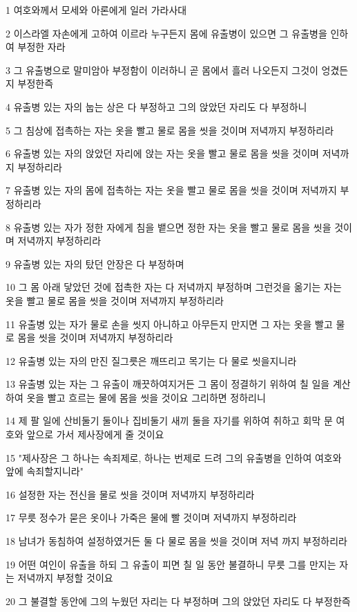 \par 1 여호와께서 모세와 아론에게 일러 가라사대
\par 2 이스라엘 자손에게 고하여 이르라 누구든지 몸에 유출병이 있으면 그 유출병을 인하여 부정한 자라
\par 3 그 유출병으로 말미암아 부정함이 이러하니 곧 몸에서 흘러 나오든지 그것이 엉겼든지 부정한즉
\par 4 유출병 있는 자의 눕는 상은 다 부정하고 그의 앉았던 자리도 다 부정하니
\par 5 그 침상에 접촉하는 자는 옷을 빨고 물로 몸을 씻을 것이며 저녁까지 부정하리라
\par 6 유출병 있는 자의 앉았던 자리에 앉는 자는 옷을 빨고 물로 몸을 씻을 것이며 저녁까지 부정하리라
\par 7 유출병 있는 자의 몸에 접촉하는 자는 옷을 빨고 물로 몸을 씻을 것이며 저녁까지 부정하리라
\par 8 유출병 있는 자가 정한 자에게 침을 뱉으면 정한 자는 옷을 빨고 물로 몸을 씻을 것이며 저녁까지 부정하리라
\par 9 유출병 있는 자의 탔던 안장은 다 부정하며
\par 10 그 몸 아래 닿았던 것에 접촉한 자는 다 저녁까지 부정하며 그런것을 옮기는 자는 옷을 빨고 물로 몸을 씻을 것이며 저녁까지 부정하리라
\par 11 유출병 있는 자가 물로 손을 씻지 아니하고 아무든지 만지면 그 자는 옷을 빨고 물로 몸을 씻을 것이며 저녁까지 부정하리라
\par 12 유출병 있는 자의 만진 질그릇은 깨뜨리고 목기는 다 물로 씻을지니라
\par 13 유출병 있는 자는 그 유출이 깨끗하여지거든 그 몸이 정결하기 위하여 칠 일을 계산하여 옷을 빨고 흐르는 물에 몸을 씻을 것이요 그리하면 정하리니
\par 14 제 팔 일에 산비둘기 둘이나 집비둘기 새끼 둘을 자기를 위하여 취하고 회막 문 여호와 앞으로 가서 제사장에게 줄 것이요
\par 15 "제사장은 그 하나는 속죄제로, 하나는 번제로 드려 그의 유출병을 인하여 여호와 앞에 속죄할지니라"
\par 16 설정한 자는 전신을 물로 씻을 것이며 저녁까지 부정하리라
\par 17 무릇 정수가 묻은 옷이나 가죽은 물에 빨 것이며 저녁까지 부정하리라
\par 18 남녀가 동침하여 설정하였거든 둘 다 물로 몸을 씻을 것이며 저녁 까지 부정하리라
\par 19 어떤 여인이 유출을 하되 그 유출이 피면 칠 일 동안 불결하니 무릇 그를 만지는 자는 저녁까지 부정할 것이요
\par 20 그 불결할 동안에 그의 누웠던 자리는 다 부정하며 그의 앉았던 자리도 다 부정한즉
